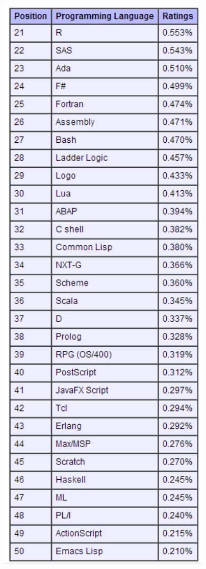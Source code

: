 \documentclass[11pt]{article} %
\begin{document}
\includegraphics[width=14cm]{extendedRanking.png}
\end{document}
